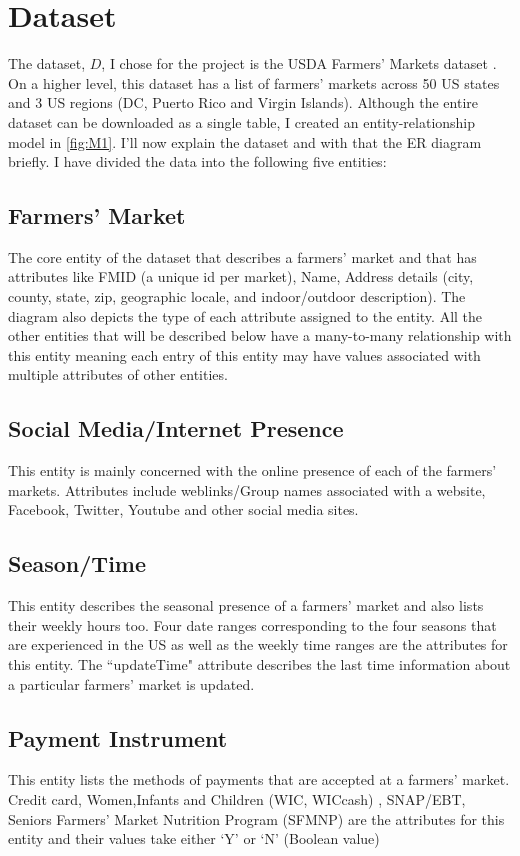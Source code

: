 \documentclass[10pt]{article}
\begin{document}
\section{Dataset} \label{dat}
The dataset, $D$, I chose for the project is the USDA Farmers' Markets dataset \cite{usda}. On a higher level, this dataset has a list of farmers' markets across 50 US states and 3 US regions (DC, Puerto Rico and Virgin Islands). Although the entire dataset can be downloaded as a single table, I created an entity-relationship model in \ref{fig:M1}. I'll now explain the dataset and with that the ER diagram briefly. I have divided the data into the following five entities:
\subsection {Farmers' Market}
The core entity of the dataset that describes a farmers' market and that has attributes like FMID (a unique id per market), Name, Address details (city, county, state, zip, geographic locale, and indoor/outdoor description). The diagram also depicts the type of each attribute assigned to the entity. All the other entities that will be described below have a many-to-many relationship with this entity meaning each entry of this entity may have values associated with multiple attributes of other entities.
\subsection{Social Media/Internet Presence}
This entity is mainly concerned with the online presence of each of the farmers' markets. Attributes include weblinks/Group names associated with a website, Facebook, Twitter, Youtube and other social media sites.
\subsection{Season/Time}
This entity describes the seasonal presence of a farmers' market and also lists their weekly hours too. Four date ranges corresponding to the four seasons that are experienced in the US as well as the weekly time ranges are the attributes for this entity. The ``updateTime" attribute describes the last time information about a particular farmers' market is updated.
\subsection {Payment Instrument}
This entity lists the methods of payments that are accepted at a farmers' market. Credit card, Women,Infants and Children (WIC, WICcash) \cite{wic}, SNAP/EBT, Seniors Farmers' Market Nutrition Program (SFMNP) \cite{sfmnp} are the attributes for this entity and their values take either `Y' or `N' (Boolean value)
\end{document}
